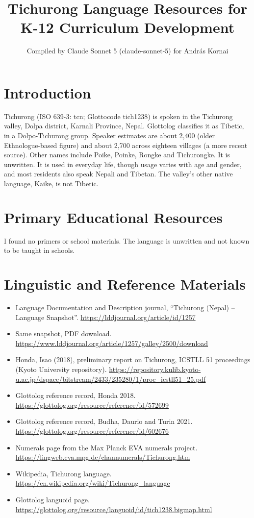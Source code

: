 \documentclass[12pt]{article}
\title{Tichurong Language Resources for K-12 Curriculum Development}
\author{Compiled by Claude Sonnet 5 (claude-sonnet-5) for Andr\'as Kornai}
\date{}
\begin{document}
\maketitle
\section{Introduction}
Tichurong (ISO 639-3: tcn; Glottocode tich1238) is spoken in the Tichurong valley, Dolpa district, Karnali Province, Nepal. Glottolog classifies it as Tibetic, in a Dolpo-Tichurong group. Speaker estimates are about 2,400 (older Ethnologue-based figure) and about 2,700 across eighteen villages (a more recent source). Other names include Poike, Poinke, Rongke and Tichurongke. It is unwritten. It is used in everyday life, though usage varies with age and gender, and most residents also speak Nepali and Tibetan. The valley's other native language, Kaike, is not Tibetic.
\section{Primary Educational Resources}
I found no primers or school materials. The language is unwritten and not known to be taught in schools.
\section{Linguistic and Reference Materials}
\begin{itemize}
\item Language Documentation and Description journal, ``Tichurong (Nepal) -- Language Snapshot''. \url{https://lddjournal.org/article/id/1257}
\item Same snapshot, PDF download. \url{https://www.lddjournal.org/article/1257/galley/2500/download}
\item Honda, Isao (2018), preliminary report on Tichurong, ICSTLL 51 proceedings (Kyoto University repository). \url{https://repository.kulib.kyoto-u.ac.jp/dspace/bitstream/2433/235280/1/proc_icstll51_25.pdf}
\item Glottolog reference record, Honda 2018. \url{https://glottolog.org/resource/reference/id/572699}
\item Glottolog reference record, Budha, Daurio and Turin 2021. \url{https://glottolog.org/resource/reference/id/602676}
\item Numerals page from the Max Planck EVA numerals project. \url{https://lingweb.eva.mpg.de/channumerals/Tichurong.htm}
\item Wikipedia, Tichurong language. \url{https://en.wikipedia.org/wiki/Tichurong_language}
\item Glottolog languoid page. \url{https://glottolog.org/resource/languoid/id/tich1238.bigmap.html}
\end{itemize}
\end{document}

